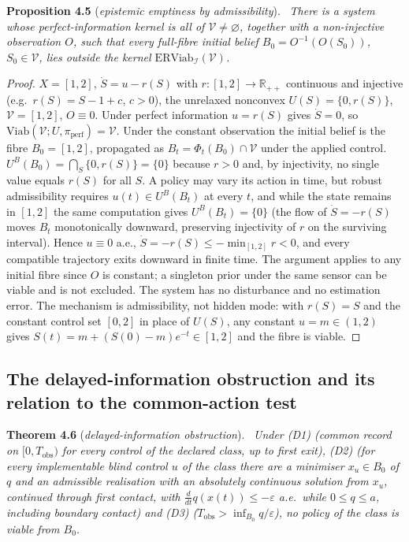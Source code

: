 \documentclass[11pt,a4paper]{article}
\theoremstyle{plain}
\theoremstyle{definition}
\theoremstyle{remark}
\newenvironment{restated}[2]{\par\medskip\noindent\textbf{#1} (\textit{#2}).\ \itshape}{\par\medskip}
\newcommand{\R}{\mathbb{R}}
\newcommand{\Viab}{\mathrm{Viab}}
\newcommand{\ERViab}{\mathrm{ERViab}}
\newcommand{\cV}{\mathcal{V}}
\newcommand{\cI}{\mathcal{I}}
\newcommand{\Tobs}{T_{\mathrm{obs}}}
\newcommand{\hyp}[1]{\textup{(#1)}}
\begin{document}
\begin{restated}{Proposition 4.5}{epistemic emptiness by admissibility}
There is a system whose perfect-information kernel is all of $\cV\ne\varnothing$, together with a non-injective observation $O$, such that every full-fibre initial belief $B_0=O^{-1}(O(S_0))$, $S_0\in\cV$, lies outside the kernel $\ERViab_\cI(\cV)$.
\end{restated}

\begin{proof}
$X=[1,2]$, $\dot S=u-r(S)$ with $r:[1,2]\to\R_{++}$ continuous and injective (e.g.\ $r(S)=S-1+c$, $c>0$), the unrelaxed nonconvex $U(S)=\{0,r(S)\}$, $\cV=[1,2]$, $O\equiv0$. Under perfect information $u=r(S)$ gives $\dot S=0$, so $\Viab(\cV;U,\pi_{\mathrm{perf}})=\cV$. Under the constant observation the initial belief is the fibre $B_0=[1,2]$, propagated as $B_t=\Phi_t(B_0)\cap\cV$ under the applied control. $U^B(B_0)=\bigcap_{S}\{0,r(S)\}=\{0\}$ because $r>0$ and, by injectivity, no single value equals $r(S)$ for all $S$. A policy may vary its action in time, but robust admissibility requires $u(t)\in U^B(B_t)$ at every $t$, and while the state remains in $[1,2]$ the same computation gives $U^B(B_t)=\{0\}$ (the flow of $\dot S=-r(S)$ moves $B_t$ monotonically downward, preserving injectivity of $r$ on the surviving interval). Hence $u\equiv0$ a.e., $\dot S=-r(S)\le-\min_{[1,2]}r<0$, and every compatible trajectory exits downward in finite time. The argument applies to any initial fibre since $O$ is constant; a singleton prior under the same sensor can be viable and is not excluded. The system has no disturbance and no estimation error. The mechanism is admissibility, not hidden mode: with $r(S)=S$ and the constant control set $[0,2]$ in place of $U(S)$, any constant $u=m\in(1,2)$ gives $S(t)=m+(S(0)-m)e^{-t}\in[1,2]$ and the fibre is viable.
\end{proof}

\subsection{The delayed-information obstruction and its relation to the common-action test}\label{S:delayed}

\begin{restated}{Theorem 4.6}{delayed-information obstruction}
Under \hyp{D1} (common record on $[0,\Tobs)$ for every control of the declared class, up to first exit), \hyp{D2} (for every implementable blind control $u$ of the class there are a minimiser $x_u\in B_0$ of $q$ and an admissible realisation with an absolutely continuous solution from $x_u$, continued through first contact, with $\tfrac{d}{dt}q(x(t))\le-\varepsilon$ a.e.\ while $0\le q\le a$, including boundary contact) and \hyp{D3} ($\Tobs>\inf_{B_0}q/\varepsilon$), no policy of the class is viable from $B_0$.
\end{restated}
\end{document}
